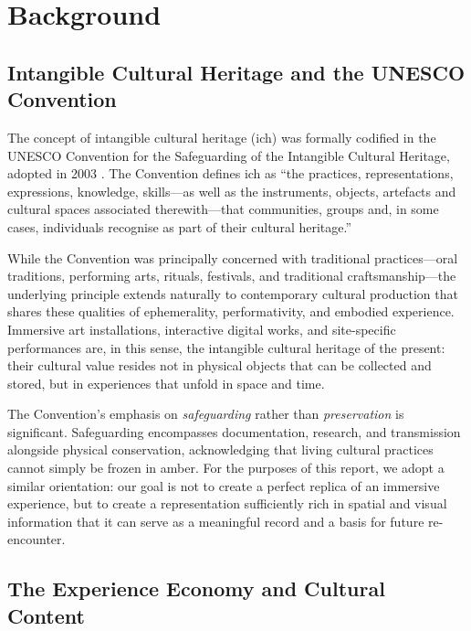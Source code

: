 \chapter{Background}
\label{ch:background}

\section{Intangible Cultural Heritage and the UNESCO Convention}
\label{sec:bg-ich}

The concept of intangible cultural heritage (\acrshort{ich}) was formally codified in the UNESCO Convention for the Safeguarding of the Intangible Cultural Heritage, adopted in 2003 \parencite{UNESCO2003}. The Convention defines \acrshort{ich} as ``the practices, representations, expressions, knowledge, skills---as well as the instruments, objects, artefacts and cultural spaces associated therewith---that communities, groups and, in some cases, individuals recognise as part of their cultural heritage.''

While the Convention was principally concerned with traditional practices---oral traditions, performing arts, rituals, festivals, and traditional craftsmanship---the underlying principle extends naturally to contemporary cultural production that shares these qualities of ephemerality, performativity, and embodied experience. Immersive art installations, interactive digital works, and site-specific performances are, in this sense, the intangible cultural heritage of the present: their cultural value resides not in physical objects that can be collected and stored, but in experiences that unfold in space and time.

The Convention's emphasis on \emph{safeguarding} rather than \emph{preservation} is significant. Safeguarding encompasses documentation, research, and transmission alongside physical conservation, acknowledging that living cultural practices cannot simply be frozen in amber. For the purposes of this report, we adopt a similar orientation: our goal is not to create a perfect replica of an immersive experience, but to create a representation sufficiently rich in spatial and visual information that it can serve as a meaningful record and a basis for future re-encounter.

\section{The Experience Economy and Cultural Content}
\label{sec:bg-experience}

